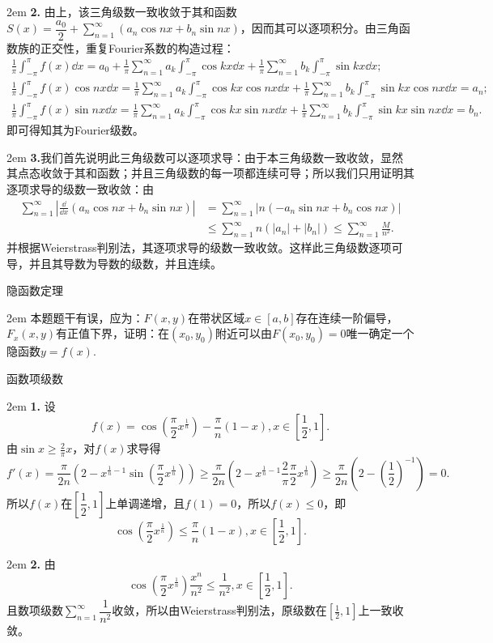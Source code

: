 \documentclass[UTF8,14pt,normal]{ctexart}
\begin{document}
    \hangindent 2em
    \noindent    
    \textbf{2.}
    由上，该三角级数一致收敛于其和函数\(S(x) = \dfrac{a_0}{2}+\sum\limits_{n=1}^{\infty}(a_n\cos nx+b_n\sin nx)\)，因而其可以逐项积分。由三角函数族的正交性，重复Fourier系数的构造过程：
    \begin{gather*}
            \frac{1}{\pi}\int_{-\pi}^{\pi}f(x)\dd x = a_0 + \frac{1}{\pi}\sum_{n=1}^{\infty}a_k\int_{-\pi}^{\pi}\cos kx\dd x+\frac{1}{\pi}\sum_{n=1}^{\infty}b_k\int_{-\pi}^{\pi}\sin kx\dd x;\\
            \frac{1}{\pi}\int_{-\pi}^{\pi}f(x)\cos nx\dd x = \frac{1}{\pi}\sum_{n=1}^{\infty}a_k\int_{-\pi}^{\pi}\cos kx\cos nx\dd x+\frac{1}{\pi}\sum_{n=1}^{\infty}b_k\int_{-\pi}^{\pi}\sin kx\cos nx\dd x = a_n;\\
            \frac{1}{\pi}\int_{-\pi}^{\pi}f(x)\sin nx\dd x = \frac{1}{\pi}\sum_{n=1}^{\infty}a_k\int_{-\pi}^{\pi}\cos kx\sin nx\dd x+\frac{1}{\pi}\sum_{n=1}^{\infty}b_k\int_{-\pi}^{\pi}\sin kx\sin nx\dd x = b_n.
    \end{gather*}
    即可得知其为Fourier级数。
    
    \hangindent 2em
    \noindent    
    \textbf{3.}我们首先说明此三角级数可以逐项求导：由于本三角级数一致收敛，显然其点态收敛于其和函数；并且三角级数的每一项都连续可导；所以我们只用证明其逐项求导的级数一致收敛：由
    \begin{equation*}
        \begin{split}
            \sum_{n=1}^{\infty}|\frac{\dd}{\dd x}(a_n\cos nx+b_n\sin nx)| &= \sum_{n=1}^{\infty}|n(-a_n\sin nx+b_n\cos nx)|\\
            &\leqslant\sum_{n=1}^{\infty}n(|a_n|+|b_n|)\leqslant\sum_{n=1}^{\infty}\frac{M}{n^2}.
        \end{split}
    \end{equation*}
    并根据Weierstrass判别法，其逐项求导的级数一致收敛。这样此三角级数逐项可导，并且其导数为导数的级数，并且连续。

 隐函数定理

    \hangindent 2em
    \noindent
    本题题干有误，应为：\(F(x,y)\)在带状区域\(x\in[a,b]\)存在连续一阶偏导，\(F_x(x,y)\)有正值下界，证明：在\((x_0,y_0)\)附近可以由\(F(x_0,y_0) = 0\)唯一确定一个隐函数\(y = f(x)\).


 函数项级数

    \hangindent 2em
    \noindent
    \textbf{1.}
    设\[f(x) = \cos(\dfrac{\pi}{2}x^{\frac{1}{n}}) - \dfrac{\pi}{n}(1-x), x\in[\dfrac{1}{2}, 1].\]
    由\(\sin x\geqslant \frac{2}{\pi}x\)，对\(f(x)\)求导得\[f'(x) = \frac{\pi}{2n}(2-x^{\frac{1}{n}-1}\sin(\frac{\pi}{2}x^{\frac{1}{n}}))\geqslant\frac{\pi}{2n}(2-x^{\frac{1}{n}-1}\frac{2}{\pi}\frac{\pi}{2}x^{\frac{1}{n}})\geqslant\frac{\pi}{2n}(2-(\frac{1}{2})^{-1}) = 0.\]
    所以\(f(x)\)在\([\dfrac{1}{2}, 1]\)上单调递增，且\(f(1) = 0\)，所以\(f(x)\leqslant0\)，即\[\cos(\frac{\pi}{2}x^{\frac{1}{n}})\leqslant\frac{\pi}{n}(1-x), x\in[\dfrac{1}{2}, 1].\]

    \hangindent 2em
    \noindent
    \textbf{2.}
    由\[\cos(\frac{\pi}{2}x^{\frac{1}{n}})\frac{x^n}{n^2}\leqslant\frac{1}{n^2},x\in[\frac{1}{2},1].\]
    且数项级数\(\sum\limits_{n=1}^{\infty}\dfrac{1}{n^2}\)收敛，所以由Weierstrass判别法，原级数在\([\frac{1}{2},1]\)上一致收敛。
\end{document}
